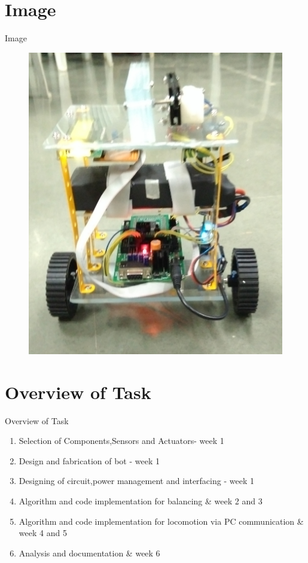 \documentclass[10pt, a4paper]{beamer}
\begin{document}
\section{Image}
\begin{frame}{Image}
	\begin{figure}
	  \includegraphics[scale=0.1]{Balance_bot.jpg}
	\end{figure}
\end{frame}

\section{Overview of Task}
\begin{frame}{Overview of Task}
        \begin{enumerate}
		\item Selection of Components,Sensors and Actuators- week 1 \\
		\item Design and fabrication of bot - week 1 \\
		\item Designing of circuit,power management and interfacing - week 1 \\
		\item Algorithm and code implementation for balancing & week 2 and 3 \\
		\item Algorithm and code implementation for locomotion via PC communication & week 4 and 5 \\
		\item Analysis and documentation & week 6 \\
        \end{enumerate}

\end{frame}
\end{document}
